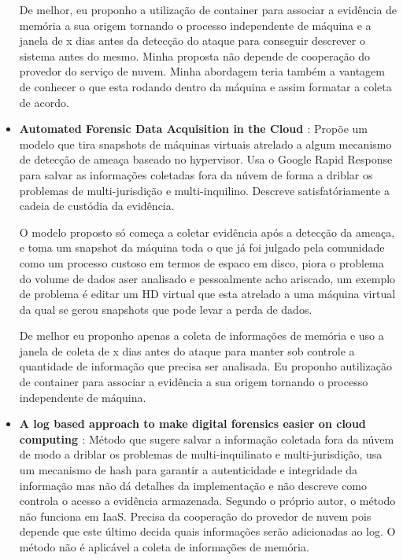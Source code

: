 \documentclass[
	12pt,				%
	openright,			%
	oneside,			%
	a4paper,			%
	english,			%
	french,				%
	spanish,			%
	brazil,				%
	]{abntex2}
\begin{document}
\begin{itemize}
De melhor, eu proponho a utilização de container para associar a evidência de memória a sua origem tornando o processo independente de máquina e a janela de x dias antes da 
detecção do ataque para conseguir descrever o sistema antes do mesmo. Minha proposta não depende de cooperação do provedor do serviço de nuvem. Minha abordagem teria também
a vantagem de conhecer o que esta rodando dentro da máquina e assim formatar a coleta de acordo.\\
  
\item \textbf{Automated Forensic Data Acquisition in the Cloud \cite{Reichert2015} }: Propõe um modelo que tira snapshots de máquinas virtuais atrelado a algum mecanismo de
detecção de ameaça baseado no hypervisor. Usa o Google Rapid Response para salvar as informações coletadas fora da núvem de forma a driblar os problemas de multi-jurisdição e 
multi-inquilino. Descreve satisfatóriamente a cadeia de custódia da evidência.

O modelo proposto só começa a coletar evidência após a detecção da ameaça, e toma um snapshot da máquina toda o que já foi julgado pela comunidade como um processo custoso em
termos de espaco em disco, piora o problema do volume de dados aser analisado e pessoalmente acho ariscado, um exemplo de problema é editar um HD virtual que esta atrelado a 
uma máquina virtual da qual se gerou snapshots que pode levar a perda de dados.

De melhor eu proponho apenas a coleta de informações de memória e uso a janela de coleta de x dias antes do ataque para manter sob controle a quantidade de informação que 
precisa ser analisada. Eu proponho autilização de container para associar a evidência a sua origem tornando o processo independente de máquina. \\
 
\item \textbf{A log based approach to make digital forensics easier on cloud computing \cite{Sang2013} }: Método que sugere salvar a informação coletada fora da núvem de modo a driblar
os problemas de multi-inquilinato e multi-jurisdição, usa um mecanismo de hash para garantir a autenticidade e integridade da informação mas não dá detalhes da implementação e 
não descreve como controla o acesso a evidência armazenada. Segundo o próprio autor, o método não funciona em IaaS. Precisa da cooperação do provedor de nuvem pois depende que 
este último decida quais informações serão adicionadas ao log. O método não é aplicável a coleta de informações de memória.


\end{itemize}
\end{document}
